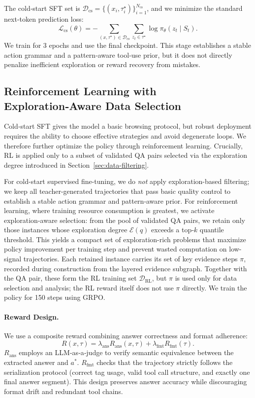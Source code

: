 The cold‑start SFT set is $\mathcal{D}_{\mathrm{cs}}=\{(x_i,\tau_i^\star)\}_{i=1}^{N_{\mathrm{cs}}}$, and we minimize the standard next‑token prediction loss:
\begin{equation}
\mathcal{L}_{\mathrm{cs}}(\theta)= -\sum_{(x,\tau^\star)\in\mathcal{D}_{\mathrm{cs}}} \sum_{z_t\in\tau^\star}\log \pi_\theta(z_t\mid S_t).
\end{equation}
We train for 3 epochs and use the final checkpoint. This stage establishes a stable action grammar and a pattern‑aware tool‑use prior, but it does not directly penalize inefficient exploration or reward recovery from mistakes.

\subsection{Reinforcement Learning with Exploration‑Aware Data Selection}
\label{sec:rl_training}

Cold‑start SFT gives the model a basic browsing protocol, but robust deployment requires the ability to choose effective strategies and avoid degenerate loops. We therefore further optimize the policy through reinforcement learning. Crucially, RL is applied only to a subset of validated QA pairs selected via the exploration degree introduced in Section~\ref{sec:data-filtering}.

For cold-start supervised fine-tuning, we do \emph{not} apply exploration-based filtering; we keep all teacher-generated trajectories that pass basic quality control to establish a stable action grammar and pattern‑aware prior. For reinforcement learning, where training resource consumption is greatest, we activate exploration-aware selection: from the pool of validated QA pairs, we retain only those instances whose exploration degree $\mathcal{E}(q)$ exceeds a top‑$k$ quantile threshold. This yields a compact set of exploration-rich problems that maximize policy improvement per training step and prevent wasted computation on low-signal trajectories. Each retained instance carries its set of key evidence steps $\pi$, recorded during construction from the layered evidence subgraph. Together with the QA pair, these form the RL training set $\mathcal{D}_{\mathrm{RL}}$, but $\pi$ is used only for data selection and analysis; the RL reward itself does not use $\pi$ directly. We train the policy for 150 steps using GRPO.

\paragraph{Reward Design.}
We use a composite reward combining answer correctness and format adherence:
\begin{equation}
R(x,\tau)=\lambda_{\mathrm{ans}}R_{\mathrm{ans}}(x,\tau)+\lambda_{\mathrm{fmt}}R_{\mathrm{fmt}}(\tau).
\end{equation}
$R_{\mathrm{ans}}$ employs an LLM‑as‑a‑judge to verify semantic equivalence between the extracted answer and $a^*$. $R_{\mathrm{fmt}}$ checks that the trajectory strictly follows the serialization protocol (correct tag usage, valid tool call structure, and exactly one final answer segment). This design preserves answer accuracy while discouraging format drift and redundant tool chains.

